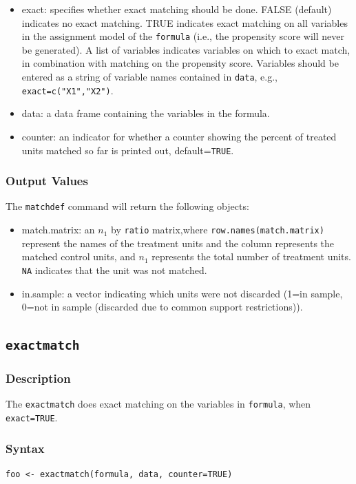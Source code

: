 \documentclass[oneside,letterpaper,titlepage]{article}
\begin{document}
\begin{appendix}
\begin{itemize}
\begin{itemize}
  \end{itemize}
\item{exact}: specifies whether exact matching should be done.  FALSE (default) indicates no exact 
  matching.  TRUE indicates exact matching on all variables in the 
  assignment model of the \texttt{formula} (i.e., the propensity score
  will never be generated).  A list of variables indicates variables on
  which to exact match, in combination with matching on the propensity
  score.  Variables should be entered as a  string
  of variable names contained in \texttt{data}, e.g.,  \texttt{exact=c("X1","X2")}.
\item{data}: a data frame containing the variables in the formula.
\item{counter}: an indicator for whether a counter showing the percent of treated units matched so far is printed out, default={\tt TRUE}.
\end{itemize}


\subsubsection{Output Values}
The \texttt{matchdef} command will return the following objects:

\begin{itemize}
\item{match.matrix}: an $n_1$ by \texttt{ratio} matrix,where
  \texttt{row.names(match.matrix)} represent the names of the
  treatment units and the column represents the matched control units, and $n_1$
  represents the total number of treatment units.  \texttt{NA}
  indicates that the unit was not matched. 
\item{in.sample}:  a vector indicating which units were not discarded (1=in sample, 0=not in sample (discarded due to common support restrictions)).
\end{itemize}

\subsection{\texttt{exactmatch}}

\subsubsection{Description}
The \texttt{exactmatch} does exact matching on the variables in {\tt formula}, when {\tt exact=TRUE}.

\subsubsection{Syntax}
\begin{verbatim}
foo <- exactmatch(formula, data, counter=TRUE)
\end{verbatim} 


\end{appendix}
\end{document}
